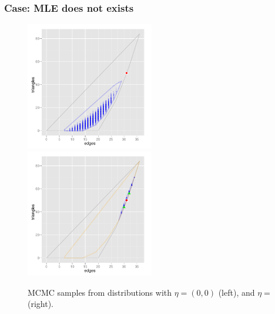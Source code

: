 \documentclass[slidestop,compress, 10pt]{beamer}
\begin{document}
\frame
{
\frametitle{Case: MLE does not exists}  
\begin{figure}[h]
\centering
\includegraphics[height=2.2in]{MCsample-boundary}
\includegraphics[height=2.2in]{MCsample-77face}
\caption{MCMC samples from distributions with $\eta = (0,0)$ (left), and $\eta=$ (right).}
\label{F:MCsample-MLE nonexistent}
\end{figure}
}
\end{document}
